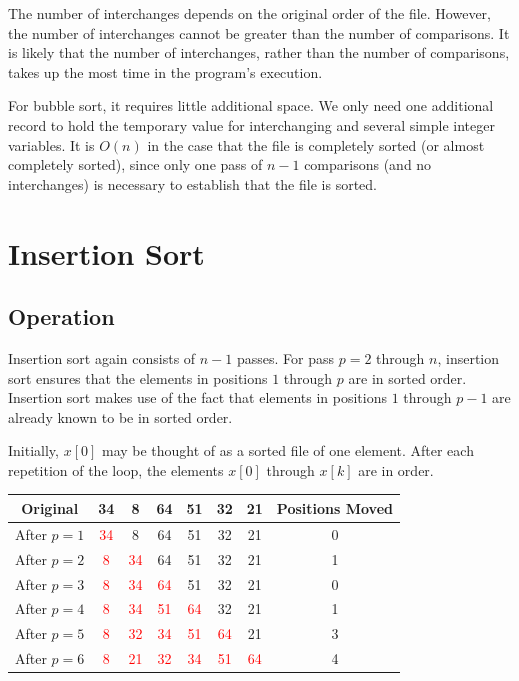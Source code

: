 The number of interchanges depends on the original order of the file. However, the number of interchanges cannot be greater than the number of comparisons. It is likely that the number of interchanges, rather than the number of comparisons, takes up the most time in the program's execution.

For bubble sort, it requires little additional space. We only need one additional record to hold the temporary value for interchanging and several simple integer variables. It is \(O(n)\) in the case that the file is completely sorted (or almost completely sorted), since only one pass of \(n - 1\) comparisons (and no interchanges) is necessary to establish that the file is sorted.

\section{Insertion Sort}
\subsection{Operation}
Insertion sort again consists of \(n - 1\) passes. For pass \(p = 2\) through \(n\), insertion sort ensures that the elements in positions \(1\) through \(p\) are in sorted order. Insertion sort makes use of the fact that elements in positions \(1\) through \(p - 1\) are already known to be in sorted order.

Initially, \(x[0]\) may be thought of as a sorted file of one element. After each repetition of the loop, the elements \(x[0]\) through \(x[k]\) are in order.

\begin{table}[H]
  \centering
  \begin{tabular}{c|c c c c c c|c}
    \toprule
    Original & 34 & 8 & 64 & 51 & 32 & 21 & Positions Moved  \\
    \midrule
    After \(p = 1\) & \textcolor{red}{34} & 8 & 64 & 51 & 32 & 21 & 0  \\
    \midrule
    After \(p = 2\) & \textcolor{red}{8} & \textcolor{red}{34} & 64 & 51 & 32 & 21 & 1  \\
    \midrule
    After \(p = 3\) & \textcolor{red}{8} & \textcolor{red}{34} & \textcolor{red}{64} & 51 & 32 & 21 & 0  \\
    \midrule
    After \(p = 4\) & \textcolor{red}{8} & \textcolor{red}{34} & \textcolor{red}{51} & \textcolor{red}{64} & 32 & 21 & 1  \\
    \midrule
    After \(p = 5\) & \textcolor{red}{8} & \textcolor{red}{32} & \textcolor{red}{34} & \textcolor{red}{51} & \textcolor{red}{64} & 21 & 3 \\
    \midrule
    After \(p = 6\) & \textcolor{red}{8} & \textcolor{red}{21} & \textcolor{red}{32} & \textcolor{red}{34} & \textcolor{red}{51} & \textcolor{red}{64} & 4 \\
    \bottomrule
  \end{tabular}
\end{table}


